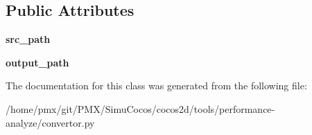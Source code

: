 \subsection*{Public Attributes}
\begin{DoxyCompactItemize}
\item 
\mbox{\label{classconvertor_1_1Convertor_ae43f26b78751249bd196df1a53873aea}} 
{\bfseries src\+\_\+path}
\item 
\mbox{\label{classconvertor_1_1Convertor_afe524892e285b2a46f3129f570214380}} 
{\bfseries output\+\_\+path}
\end{DoxyCompactItemize}


The documentation for this class was generated from the following file\+:\begin{DoxyCompactItemize}
\item 
/home/pmx/git/\+P\+M\+X/\+Simu\+Cocos/cocos2d/tools/performance-\/analyze/convertor.\+py\end{DoxyCompactItemize}
